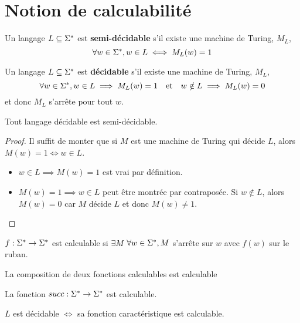 \section{Notion de calculabilité}


\begin{definition}
	Un langage $L \subseteq \Sigma^{*}$ est \textbf{semi-décidable} s'il existe une machine de Turing, $M_L$, \tlq
	$$ \forall w \in \Sigma^{*}, w \in L \iff M_L(w) = 1 $$
\end{definition}

\begin{definition}
	Un langage $L \subseteq \Sigma^{*}$ est \textbf{décidable} s'il existe une machine de Turing, $M_L$, \tlq
	$$ \forall w \in \Sigma^{*}, w \in L \implies M_L(w) = 1 \quad \text{et} \quad w \notin L \implies M_L(w) = 0 $$
	et donc $M_L$ s'arrête pour tout $w$.
\end{definition}

\begin{prop}
	Tout langage décidable est semi-décidable.
\end{prop}

\begin{proof}
	Il suffit de monter que si $M$ est une machine de Turing qui décide $L$, alors $M(w) = 1 \iff w \in L$.
	\begin{itemize}
		\item $w \in L \implies M(w) = 1$ est vrai par définition.
		\item $M(w) = 1 \implies w \in L$ peut être montrée par contraposée. Si $w \notin L$, alors $M(w) = 0$ car $M$ décide $L$ et donc $M(w) \neq 1$.
	\end{itemize}
\end{proof}

\begin{definition}
	$f : \Sigma^{*} \to \Sigma^{*}$ est calculable si $\exists M$ \tq $\forall w \in \Sigma^{*}, M$ s'arrête sur $w$ avec $f(w)$ sur le ruban.
\end{definition}

\begin{lemma}
	La composition de deux fonctions calculables est calculable
\end{lemma}

\begin{lemma}
	La fonction $succ : \Sigma^{*} \to \Sigma^{*}$ est calculable.
\end{lemma}

\begin{prop}
	$L$ est décidable $\iff$ sa fonction caractéristique est calculable.
\end{prop}

